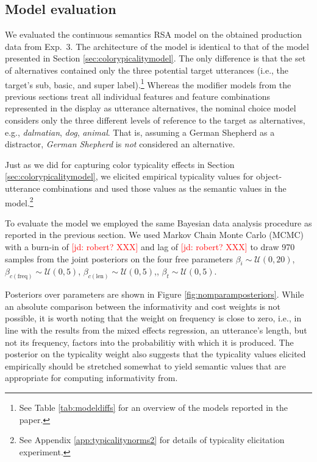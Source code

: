 \documentclass[11pt]{article}
\newcommand{\jd}[1]{\textcolor{Red}{[jd: #1]}}
\newcommand{\tableref}[1]{Table \ref{#1}}
\newcommand{\figref}[1]{Figure \ref{#1}}
\newcommand{\appref}[1]{Appendix \ref{#1}}
\newcommand{\sectionref}[1]{Section \ref{#1}}
\begin{document}
\subsection{Model evaluation}
\label{sec:reflevelmodel}


We evaluated the continuous semantics RSA model on the obtained production data from Exp.~3. The architecture of the model is identical to that of the model presented in \sectionref{sec:colorypicalitymodel}. The only difference is that the set of alternatives contained only the three potential target utterances (i.e., the target's sub, basic, and super label).\footnote{See \tableref{tab:modeldiffs} for an overview of the models reported in the paper.} Whereas the modifier models from the previous sections treat all individual features and feature combinations represented in the display as utterance alternatives, the nominal choice model considers only the three different levels of reference to the target as alternatives, e.g., \emph{dalmatian}, \emph{dog}, \emph{animal}. That is, assuming a German Shepherd as a distractor, \emph{German Shepherd} is \emph{not} considered an alternative.

Just as we did for capturing color typicality effects in \sectionref{sec:colorypicalitymodel}, we elicited empirical typicality values for object-utterance combinations and used those values as the semantic values in the model.\footnote{See \appref{app:typicalitynorms2} for details of typicality elicitation experiment.} 


To evaluate the model we employed the same Bayesian data analysis procedure as reported in the previous section. We used Markov Chain Monte Carlo (MCMC) with a burn-in of \jd{robert? XXX} and lag of \jd{robert? XXX} to draw 970 samples from the joint posteriors on the four free parameters  $\beta_i  \sim \mathcal{U}(0,20)$,  $\beta_{c(\textrm{freq})} \sim \mathcal{U}(0,5)$, $\beta_{c(\textrm{len})} \sim \mathcal{U}(0,5)$,, $\beta_t  \sim \mathcal{U}(0,5)$.

Posteriors over parameters are shown in \figref{fig:nomparamposteriors}. While an absolute comparison between the informativity and cost weights is not possible, it is worth noting that the weight on frequency is close to zero, i.e., in line with the results from the mixed effects regression, an utterance's length, but not its frequency, factors into the probabilitiy with which it is produced. The posterior on the typicality weight also suggests that the typicality values elicited empirically should be stretched somewhat to yield semantic values that are appropriate for computing informativity from.
\end{document}
